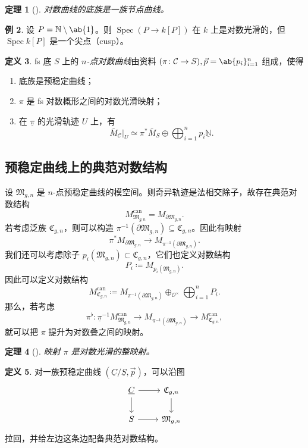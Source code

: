 \documentclass{amsart}
\newtheorem{thm}{定理}[section]
\theoremstyle{definition}
\newtheorem{defn}[thm]{定义}
\newtheorem{exm}[thm]{例}
\theoremstyle{remark}
\theoremstyle{plain}
\theoremstyle{definition}
\theoremstyle{remark}
\newcommand{\N}{\mathbb{N}}
\newcommand{\mc}[1]{\mathcal{#1}}
\newcommand{\mf}[1]{\mathfrak{#1}}
\newcommand{\on}[1]{\operatorname{#1}}
\newcommand{\ul}[1]{\underline{#1}}
\newcommand{\1}{\mathbf{1}}
\newcommand{\2}{\mathbf{2}}
\newcommand{\3}{\mathbf{3}}
\DeclareMathOperator{\Spec}{Spec}
\begin{document}
\begin{thm}[{\cite{FKato2000}}]
    对数曲线的底族是一族节点曲线。
\end{thm}

\begin{exm}
    设 \(P = \N \setminus \ab\{1\}\)。则 \(\Spec (P \to k[P])\) 在 \(k\) 上是对数光滑的，但 \(\Spec k[P]\) 是一个尖点（cusp）。
\end{exm}

\begin{defn}
    fs 底 \(S\) 上的 \textit{\(n\)-点对数曲线}由资料 \((\pi \colon \mc{C} \to S), \vec{p} = \ab\{p_i\}_{i=1}^n\) 组成，使得
    \begin{enumerate}
        \item 底族是预稳定曲线；
        \item \(\pi\) 是 fs 对数概形之间的对数光滑映射；
        \item 在 \(\ul{\pi}\) 的光滑轨迹 \(U\) 上，有
            \[ \bar{M}_{\mc{C}}|_U \simeq \pi^* \bar{M}_S \oplus \bigoplus_{i=1}^n p_i \ul{\N}. \]
    \end{enumerate}
\end{defn}

\subsection{预稳定曲线上的典范对数结构}%
\label{sub:Canonical log structures on prestable curves}

设 \(\mf{M}_{g,n}\) 是 \(n\)-点预稳定曲线的模空间。则奇异轨迹是法相交除子，故存在典范对数结构
\[ M_{\mf{M}_{g,n}}^{\on{can}} = M_{\partial \mf{M}_{g,n}}. \]
若考虑泛族 \(\mf{C}_{g,n}\)，则可以构造 \(\pi^{-1}(\partial \mf{M}_{g,n}) \subseteq \mf{C}_{g,n}\)。因此有映射
\[ \pi^* M_{\partial \mf{M}_{g,n}} \to M_{\pi^{-1}(\partial \mf{M}_{g,n})}. \]
我们还可以考虑除子 \(p_i(\mf{M}_{g,n}) \subset \mf{C}_{g,n}\)，它们也定义对数结构
\[ P_i \coloneqq M_{p_i(\mf{M}_{g,n})}. \]
因此可以定义对数结构
\[ M_{\mf{C}_{g,n}}^{\on{can}} \coloneqq M_{\pi^{-1}(\partial\mf{M}_{g,n})} \oplus_{\mc{O}^{\times}} \bigoplus_{i=1}^n P_i. \]
那么，若考虑
\[ \pi^{\flat} \colon \ul{\pi}^{-1} M_{\mf{M}_{g,n}}^{\on{can}} \to M_{\pi^{-1}(\partial \mf{M}_{g,n})} \to M_{\mf{C}_{g,n}}^{\on{can}}, \]
就可以把 \(\pi\) 提升为对数叠之间的映射。

\begin{thm}[{\cite{FKato2000}}]
    映射 \(\pi\) 是对数光滑的整映射。
\end{thm}

\begin{defn}
    对一族预稳定曲线 \((\ul{C}/\ul{S}, \vec{p})\)，可以沿图
    \begin{equation*}
    \begin{tikzcd}
        \ul{C} \ar{r} \ar{d} & \mf{C}_{g,n} \ar{d} \\
        S \ar{r} & \mf{M}_{g,n}
    \end{tikzcd}
    \end{equation*}
    拉回，并给左边这条边配备典范对数结构。
\end{defn}
\end{document}
